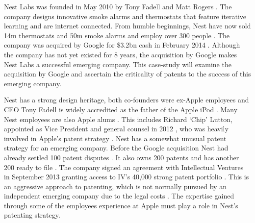 {}

Nest Labs was founded in May 2010 by Tony Fadell and Matt Rogers \cite{NestFactsheet}.
The company designs innovative smoke alarms and thermostats that feature iterative learning and are internet connected.
From humble beginnings, Nest have now sold 14m thermostats and 50m smoke alarms and employ over 300 people \cite{NestFactsheet}.
The company was acquired by Google for \$3.2bn cash \cite{NestReuters} in February 2014 \cite{NestFactsheet}.
Although the company has not yet existed for 8 years, the acquisition by Google makes Nest Labs a successful emerging company.
This case-study will examine the acquisition by Google and ascertain the criticality of patents to the success of this emerging company.

Nest has a strong design heritage, both co-founders were ex-Apple employees and CEO Tony Fadell is widely accredited as the father of the Apple iPod \cite{NestAppleInsider}.
Many Nest employees are also Apple alums \cite{NestReuters}.
This includes Richard `Chip' Lutton, appointed as Vice President and general counsel in 2012 \cite{NestAppleInsider}, who was heavily involved in Apple's patent strategy \cite{NestReuters}.
Nest has a somewhat unusual patent strategy for an emerging company.
Before the Google acquisition Nest had already settled 100 patent disputes \cite{NestCoLabs}.
It also owns 200 patents and has another 200 ready to file \cite{NestCoLabs, NestIV}.
The company signed an agreement with Intellectual Ventures in September 2013 granting access to IV's 40,000 strong patent portfolio \cite{NestIV}.
This is an aggressive approach to patenting, which is not normally pursued by an independent emerging company due to the legal costs \cite{zahra1996technology}.
The expertise gained through some of the employees experience at Apple must play a role in Nest's patenting strategy.

